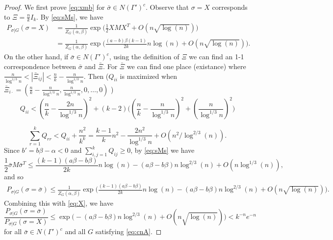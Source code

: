 \documentclass{article}
\begin{document}
\begin{proof}
We first prove \eqref{eq:xmb} for $\bar{\sigma}\in N(\Gamma')^c$.
Observe that $\sigma=X$ corresponds to $\Xi=\frac{n}{k} I_k$. By \eqref{eq:sMs}, we have
\begin{equation} \label{eq:X}
\begin{aligned}
P_{\sigma|G}(\sigma=X) & =\frac{1}{Z_G(\alpha,\beta)}
\exp\Big(\frac{1}{2} X M X^T + O(n\sqrt{\log(n)}) \Big)  \\
& =\frac{1}{Z_G(\alpha,\beta)}
\exp\Big(\frac{(a-b)\beta(k-1)}{2k}n\log(n) + O(n\sqrt{\log(n)}) \Big) .
\end{aligned}
\end{equation}
On the other hand, if $\bar{\sigma}\in N(\Gamma')^c$, using the definition of $\Xi$ we can find an 1-1 correspondence
between $\bar{\sigma}$ and $\bar{\Xi}$. For $\bar{\Xi}$ we can find one place (existance) where 
$\frac{n}{\log^{1/3} n} < |\bar{\Xi}_{ij}| < \frac{n}{k}- \frac{n}{\log^{1/3} n}$. Then ($Q_{ii}$ is maximized
when $\bar{\Xi}_{i\cdot} = (\frac{n}{k} - \frac{n}{\log^{1/3} n},\frac{n}{\log^{1/3} n}, 0, \dots, 0)$
)
$$
Q_{ii} < (\frac{n}{k}-\frac{2n}{\log^{1/3} n})^2 + (k-2)\Big( (\frac{n}{k} - \frac{n}{\log^{1/3} n})^2 + (\frac{n}{\log^{1/3} n})^2 \Big)
$$

$$
\sum_{r=1}^k Q_{rr} < Q_{ii} + \frac{n^2}{k^k} = \frac{k-1}{k}n^2 - \frac{2n^2}{\log^{1/3} n}
+O(n^2/\log^{2/3}(n)).
$$
Since $b' = b\beta-\alpha<0$ and $\sum_{i,j=1}^k Q_{ij} \geq 0$, by \eqref{eq:sMs} we have
$$
\frac{1}{2}\bar{\sigma} M \bar{\sigma}^T  
\le \frac{(k-1)(a\beta-b\beta)}{2k}n\log(n)
-(a\beta-b\beta)n\log^{2/3}(n)
+O(n\log^{1/3}(n)) ,
$$
and so
\begin{align*}
P_{\sigma|G}(\sigma=\bar{\sigma}) \le \frac{1}{Z_G(\alpha,\beta)}
\exp\Big(\frac{(k-1)(a\beta-b\beta)}{2k}n\log(n) 
-(a\beta-b\beta)n\log^{2/3}(n)
+ O(n\sqrt{\log(n)}) \Big) .
\end{align*}
Combining this with \eqref{eq:X}, we have
$$
\frac{P_{\sigma|G}(\sigma=\bar{\sigma})}{P_{\sigma|G}(\sigma=X)}
\le \exp\Big(-(a\beta-b\beta)n\log^{2/3}(n)
+ O(n\sqrt{\log(n)}) \Big)
<k^{-n} e^{-n}
$$
for all $\bar{\sigma}\in N(\Gamma')^c$ and all $G$ satisfying \eqref{eq:cnA}. 


\end{proof}
\end{document}
